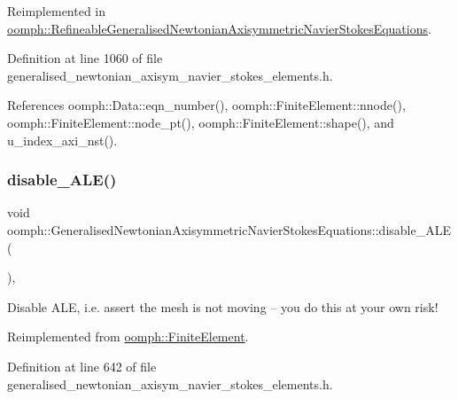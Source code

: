 Reimplemented in \hyperlink{classoomph_1_1RefineableGeneralisedNewtonianAxisymmetricNavierStokesEquations_a36b7f19e66187a7b0fef8e0134e716f4}{oomph\+::\+Refineable\+Generalised\+Newtonian\+Axisymmetric\+Navier\+Stokes\+Equations}.



Definition at line 1060 of file generalised\+\_\+newtonian\+\_\+axisym\+\_\+navier\+\_\+stokes\+\_\+elements.\+h.



References oomph\+::\+Data\+::eqn\+\_\+number(), oomph\+::\+Finite\+Element\+::nnode(), oomph\+::\+Finite\+Element\+::node\+\_\+pt(), oomph\+::\+Finite\+Element\+::shape(), and u\+\_\+index\+\_\+axi\+\_\+nst().

\mbox{\label{classoomph_1_1GeneralisedNewtonianAxisymmetricNavierStokesEquations_af6cf9daf6162eda987c95fc6a75a43db}} 
\subsubsection{\texorpdfstring{disable\+\_\+\+A\+L\+E()}{disable\_ALE()}}
{\footnotesize\ttfamily void oomph\+::\+Generalised\+Newtonian\+Axisymmetric\+Navier\+Stokes\+Equations\+::disable\+\_\+\+A\+LE (\begin{DoxyParamCaption}{ }\end{DoxyParamCaption})\hspace{0.3cm}{\ttfamily [inline]}, {\ttfamily [virtual]}}



Disable A\+LE, i.\+e. assert the mesh is not moving -- you do this at your own risk! 



Reimplemented from \hyperlink{classoomph_1_1FiniteElement_a625ea6d3f9baccfbdd1323315fb3ec71}{oomph\+::\+Finite\+Element}.



Definition at line 642 of file generalised\+\_\+newtonian\+\_\+axisym\+\_\+navier\+\_\+stokes\+\_\+elements.\+h.

